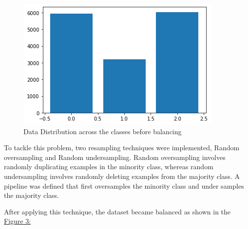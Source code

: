 \documentclass[sigconf]{acmart}
\begin{document}
\begin{figure}[h]
  \centering
 
  \includegraphics[width=\linewidth]{../supplements/1.data_distribution_before_balancinf.png}
 
    \caption{Data Distribution across the classes before balancing}
  \label{Fig.2}
\end{figure}


To tackle this problem, two resampling techniques were implemented, Random oversampling and Random undersampling. Random oversampling involves randomly duplicating examples in the minority class, whereas random undersampling involves randomly deleting examples from the majority class. A pipeline was defined that first oversamples the minority class and under samples the majority class.

After applying this technique, the dataset became balanced as shown in the \hyperref[Fig.3]{Figure 3:}
\end{document}
